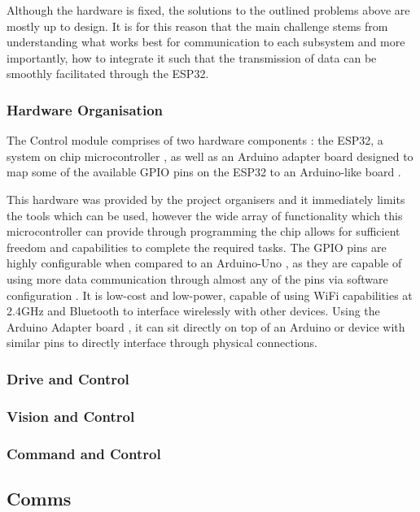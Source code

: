 \documentclass[a4paper]{article}
\begin{document}
Although the hardware is fixed, the solutions to the outlined problems
above are mostly up to design. It is for this reason that the main challenge
stems from understanding what works best for communication to each subsystem
and more importantly, how to integrate it such that the transmission of data
can be smoothly facilitated through the ESP32.

\subsubsection{Hardware Organisation}

The Control module comprises of two hardware components \cite{BoxContent}: 
the ESP32, a system on chip microcontroller \cite{ESP32Datasheet}, as well as an Arduino adapter
board designed to map some of the available GPIO pins on the ESP32 to an Arduino-like
board \cite{ESP32ArduinoAdapter}.

This hardware was provided by the project organisers and it immediately limits
the tools which can be used, however the wide array of functionality which
this microcontroller can provide through programming the chip allows
for sufficient freedom and capabilities to complete the required tasks. The
GPIO pins are highly configurable when compared to an Arduino-Uno \cite{MicrocontrollerComparison}, as they
are capable of using more data communication through almost any of the pins
via software configuration \cite{ESP32PinOut}. It is low-cost and low-power, 
capable of using WiFi capabilities at 2.4GHz and Bluetooth \cite{ESP32Datasheet} to interface wirelessly
with other devices. Using the Arduino Adapter board \cite{ESP32ArduinoAdapter}, it can sit directly on top of
an Arduino or device with similar pins to directly interface through physical connections. 


\subsubsection{Drive and Control}

\subsubsection{Vision and Control}

\subsubsection{Command and Control}

\subsection{Comms}
\end{document}
